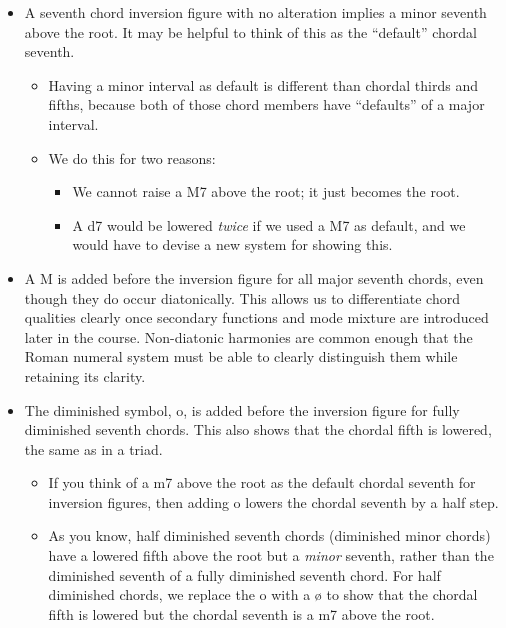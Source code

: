 \documentclass{book}
\providecommand{\tightlist}{%
  \setlength{\itemsep}{0pt}\setlength{\parskip}{0pt}}
\begin{document}
\begin{itemize}
  \begin{itemize}
  \tightlist
  \item
    A seventh chord inversion figure with no alteration implies a minor
    seventh above the root. It may be helpful to think of this as the
    ``default'' chordal seventh.

    \begin{itemize}
    \tightlist
    \item
      Having a minor interval as default is different than chordal thirds and
      fifths, because both of those chord members have ``defaults'' of a major
      interval.
    \item
      We do this for two reasons:

      \begin{itemize}
      \tightlist
      \item
        We cannot raise a M7 above the root; it just becomes the root.
      \item
        A d7 would be lowered \emph{twice} if we used a M7 as default, and we
        would have to devise a new system for showing this.
      \end{itemize}
    \end{itemize}
  \item
    A M is added before the inversion figure for all major seventh chords,
    even though they do occur diatonically. This allows us to differentiate
    chord qualities clearly once secondary functions and mode mixture are
    introduced later in the course. Non-diatonic harmonies are common enough
    that the Roman numeral system must be able to clearly distinguish them
    while retaining its clarity.
  \item
    The diminished symbol, o, is added before the inversion figure for fully
    diminished seventh chords. This also shows that the chordal fifth is
    lowered, the same as in a triad.

    \begin{itemize}
    \tightlist
    \item
      If you think of a m7 above the root as the default chordal seventh for
      inversion figures, then adding o lowers the chordal seventh by a half
      step.
    \item
      As you know, half diminished seventh chords (diminished minor chords)
      have a lowered fifth above the root but a \emph{minor} seventh, rather
      than the diminished seventh of a fully diminished seventh chord. For
      half diminished chords, we replace the o with a ø to show that the
      chordal fifth is lowered but the chordal seventh is a m7 above the root.
    \end{itemize}
  \end{itemize}
\end{itemize}
\end{document}
